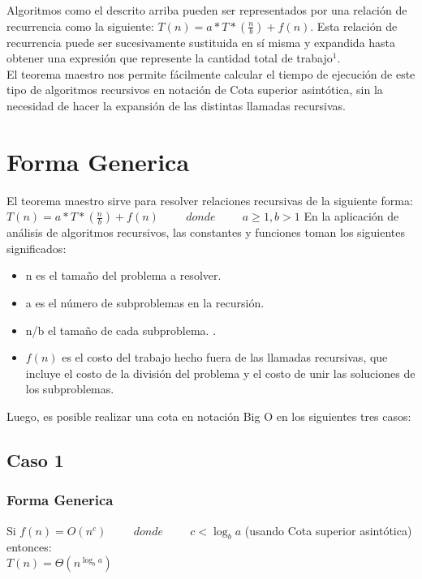 \documentclass[12pt]{article}
\begin{document}
Algoritmos como el descrito arriba pueden ser representados por una relación de recurrencia como la siguiente: $T(n)=a*T*(\frac{n}{b})+f(n)$. Esta relación de recurrencia puede ser sucesivamente sustituida en sí misma y expandida hasta obtener una expresión que represente la cantidad total de trabajo$^1$.\\

El teorema maestro nos permite fácilmente calcular el tiempo de ejecución de este tipo de algoritmos recursivos en notación de Cota superior asintótica, sin la necesidad de hacer la expansión de las distintas llamadas recursivas.\\

\section*{Forma Generica}
El teorema maestro sirve para resolver relaciones recursivas de la siguiente forma:\\
$T(n)=a*T*(\frac{n}{b})+f(n) \hspace{1cm} donde \hspace{1cm} a\geq 1, b>1$
En la aplicación de análisis de algoritmos recursivos, las constantes y funciones toman los siguientes significados:\\
\begin{itemize}
    \item n es el tamaño del problema a resolver.
    \item a es el número de subproblemas en la recursión.
    \item n/b el tamaño de cada subproblema. .
    \item $f(n)$ es el costo del trabajo hecho fuera de las llamadas recursivas, que incluye el costo de la división del problema y el costo de unir las soluciones de los subproblemas.
\end{itemize}
Luego, es posible realizar una cota en notación Big O en los siguientes tres casos:
\subsection*{Caso 1}
\subsubsection*{Forma Generica}
Si $f(n)=O(n^{c}) \hspace{1cm} donde \hspace{1cm} c<\log_{b}a$ (usando Cota superior asintótica)\\
entonces:\\
$T(n)=\Theta(n^{\log_{b}a})$
\end{document}
